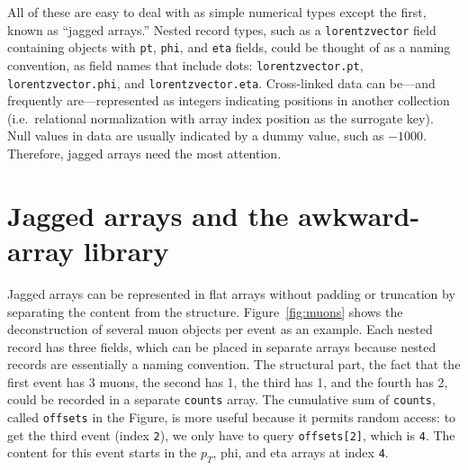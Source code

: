 \documentclass[a4paper]{jpconf}
\begin{document}
All of these are easy to deal with as simple numerical types except the first, known as ``jagged arrays.'' Nested record types, such as a {\tt lorentzvector} field containing objects with {\tt pt}, {\tt phi}, and {\tt eta} fields, could be thought of as a naming convention, as field names that include dots: {\tt lorentzvector.pt}, {\tt lorentzvector.phi}, and {\tt lorentzvector.eta}. Cross-linked data can be---and frequently are---represented as integers indicating positions in another collection (i.e.\ relational normalization with array index position as the surrogate key). Null values in data are usually indicated by a dummy value, such as $-1000$. Therefore, jagged arrays need the most attention.

\section{Jagged arrays and the awkward-array library}

Jagged arrays can be represented in flat arrays without padding or truncation by separating the content from the structure. Figure~\ref{fig:muons} shows the deconstruction of several muon objects per event as an example. Each nested record has three fields, which can be placed in separate arrays because nested records are essentially a naming convention. The structural part, the fact that the first event has 3 muons, the second has 1, the third has 1, and the fourth has 2, could be recorded in a separate {\tt counts} array. The cumulative sum of {\tt counts}, called {\tt offsets} in the Figure, is more useful because it permits random access: to get the third event (index {\tt 2}), we only have to query {\tt offsets[2]}, which is {\tt 4}. The content for this event starts in the $p_T$, phi, and eta arrays at index {\tt 4}.
\end{document}
